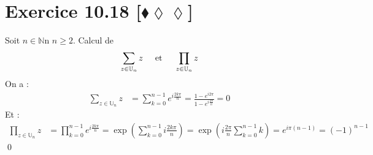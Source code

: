 \documentclass[10pt]{article}
\begin{document}
\section*{Exercice 10.18 [$\blacklozenge\lozenge\lozenge$]}
\begin{tcolorbox}[enhanced, width=7in, center, size=fbox, fontupper=\large, drop shadow southwest]
    Soit $n\in\mathbb{N}$n $n\geq2$. Calcul de
    \begin{equation*}
        \sum_{z\in\mathbb{U}_n}{z} \hspace{0.5cm} \text{et} \hspace{0.5cm} \prod_{z\in\mathbb{U}_n}z
    \end{equation*}
    On a :
    \begin{align*}
        \sum_{z\in\mathbb{U}_n}{z}&=\sum_{k=0}^{n-1}{e^{i\frac{2k\pi}{n}}}=\frac{1-e^{i2\pi}}{1-e^{i\frac{2\pi}{n}}}=0
    \end{align*}
    Et :
    \begin{align*}
        \prod_{z\in\mathbb{U}_n}{z}&=\prod_{k=0}^{n-1}{e^{i\frac{2k\pi}{n}}}=\exp\left( \sum_{k=0}^{n-1}{i\frac{2k\pi}{n}} \right) = \exp\left( i\frac{2\pi}{n}\sum_{k=0}^{n-1}{k} \right)=e^{i\pi(n-1)}=(-1)^{n-1}
    \end{align*}
    \qed
\end{tcolorbox}

\end{document}
